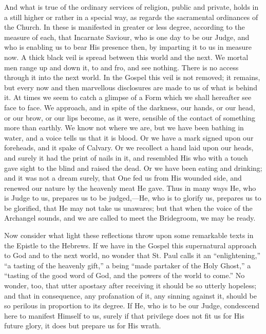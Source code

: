And what is true of the ordinary services of religion, public and
private, holds in a still higher or rather in a special way, as
regards the sacramental ordinances of the Church. In these is
manifested in greater or less degree, according to the measure of
each, that Incarnate Saviour, who is one day to be our Judge, and who
is enabling us to bear His presence then, by imparting it to us in
measure now. A thick black veil is spread between this world and the
next. We mortal men range up and down it, to and fro, and see nothing.
There is no access through it into the next world. In the Gospel this
veil is not removed; it remains, but every now and then marvellous
disclosures are made to us of what is behind it. At times we seem to
catch a glimpse of a Form which we shall hereafter see face to face.
We approach, and in spite of the darkness, our hands, or our head, or
our brow, or our lips become, as it were, sensible of the contact of
something more than earthly. We know not where we are, but we have
been bathing in water, and a voice tells us that it is blood. Or we
have a mark signed upon our foreheads, and it spake of Calvary. Or we
recollect a hand laid upon our heads, and surely it had the print of
nails in it, and resembled His who with a touch gave sight to the
blind and raised the dead. Or we have been eating and drinking; and it
was not a dream surely, that One fed us from His wounded side, and
renewed our nature by the heavenly meat He gave. Thus in many ways He,
who is Judge to us, prepares us to be judged,—He, who is to glorify
us, prepares us to be glorified, that He may not take us unawares; but
that when the voice of the Archangel sounds, and we are called to meet
the Bridegroom, we may be ready.

Now consider what light these reflections throw upon some
remarkable texts in the Epistle to the Hebrews. If we have in the
Gospel this supernatural approach to God and to the next world, no
wonder that St. Paul calls it an ``enlightening,'' ``a
tasting of the heavenly gift,'' a being ``made partaker of the
Holy Ghost,'' a ``tasting of the good word of God, and the
powers of the world to come.'' No wonder, too, that utter apostasy
after receiving it should be so utterly hopeless; and that in
consequence, any profanation of it, any sinning against it, should be
so perilous in proportion to its degree. If He, who is to be our
Judge, condescend here to manifest Himself to us, surely if that
privilege does not fit us for His future glory, it does but prepare us
for His wrath.

